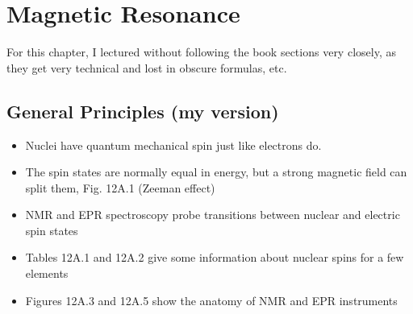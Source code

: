\documentclass[12pt, openany, letterpaper]{memoir}
\begin{document}
\chapter{Magnetic Resonance}
For this chapter, I lectured without following the book sections very closely, as they get very technical and lost in obscure formulas, etc.
\section{General Principles (my version)}
\begin{itemize}
	\item Nuclei have quantum mechanical spin just like electrons do.
	\item The spin states are normally equal in energy, but a strong magnetic field can split them, Fig. 12A.1 (Zeeman effect)
	\item NMR and EPR spectroscopy probe transitions between nuclear and electric spin states
	\item Tables 12A.1 and 12A.2 give some information about nuclear spins for a few elements
	\item Figures 12A.3 and 12A.5 show the anatomy of NMR and EPR instruments
\end{itemize}
\end{document}
